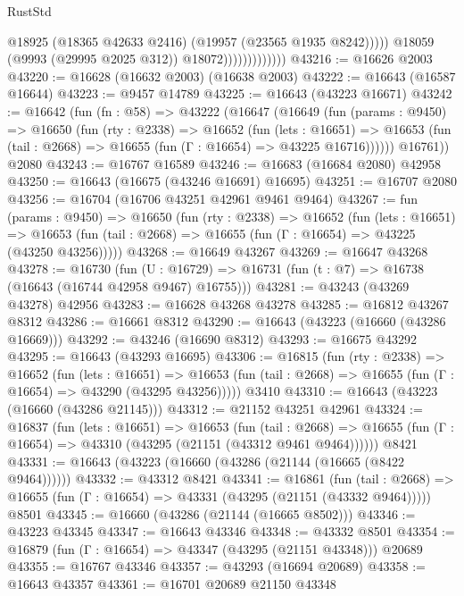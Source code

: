 \begin{lexlean}{RustStd}
\begin{coremodule}
                                    @18925
                                    (@18365 @42633 @2416)
                                    (@19957 (@23565 @1935 @8242)))))
                              @18059
                              (@9993 (@29995 @2025 @312))
                              @18072)))))))))))))
@43216 := @16626 @2003
@43220 := @16628 (@16632 @2003) (@16638 @2003)
@43222 := @16643 (@16587 @16644)
@43223 := @9457 @14789
@43225 := @16643 (@43223 @16671)
@43242 := @16642
    (fun (fn : @58) =>
    @43222
      (@16647
        (@16649
          (fun (params : @9450) =>
          @16650
            (fun (rty : @2338) =>
            @16652
              (fun (lets : @16651) =>
              @16653 (fun (tail : @2668) => @16655 (fun (Γ : @16654) => @43225 @16716))))))
        @16761))
    @2080
@43243 := @16767 @16589
@43246 := @16683 (@16684 @2080) @42958
@43250 := @16643 (@16675 (@43246 @16691) @16695)
@43251 := @16707 @2080
@43256 := @16704 (@16706 @43251 @42961 @9461 @9464)
@43267 := fun (params : @9450) =>
  @16650
    (fun (rty : @2338) =>
    @16652
      (fun (lets : @16651) =>
      @16653 (fun (tail : @2668) => @16655 (fun (Γ : @16654) => @43225 (@43250 @43256)))))
@43268 := @16649 @43267
@43269 := @16647 @43268
@43278 := @16730
    (fun (U : @16729) => @16731 (fun (t : @7) => @16738 (@16643 (@16744 @42958 @9467) @16755)))
@43281 := @43243 (@43269 @43278) @42956
@43283 := @16628 @43268 @43278
@43285 := @16812 @43267 @8312
@43286 := @16661 @8312
@43290 := @16643 (@43223 (@16660 (@43286 @16669)))
@43292 := @43246 (@16690 @8312)
@43293 := @16675 @43292
@43295 := @16643 (@43293 @16695)
@43306 := @16815
    (fun (rty : @2338) =>
    @16652
      (fun (lets : @16651) =>
      @16653 (fun (tail : @2668) => @16655 (fun (Γ : @16654) => @43290 (@43295 @43256)))))
    @3410
@43310 := @16643 (@43223 (@16660 (@43286 @21145)))
@43312 := @21152 @43251 @42961
@43324 := @16837
    (fun (lets : @16651) =>
    @16653
      (fun (tail : @2668) =>
      @16655 (fun (Γ : @16654) => @43310 (@43295 (@21151 (@43312 @9461 @9464))))))
    @8421
@43331 := @16643 (@43223 (@16660 (@43286 (@21144 (@16665 (@8422 @9464))))))
@43332 := @43312 @8421
@43341 := @16861
    (fun (tail : @2668) => @16655 (fun (Γ : @16654) => @43331 (@43295 (@21151 (@43332 @9464)))))
    @8501
@43345 := @16660 (@43286 (@21144 (@16665 @8502)))
@43346 := @43223 @43345
@43347 := @16643 @43346
@43348 := @43332 @8501
@43354 := @16879 (fun (Γ : @16654) => @43347 (@43295 (@21151 @43348))) @20689
@43355 := @16767 @43346
@43357 := @43293 (@16694 @20689)
@43358 := @16643 @43357
@43361 := @16701 @20689 @21150 @43348

\end{coremodule}
\end{lexlean}

